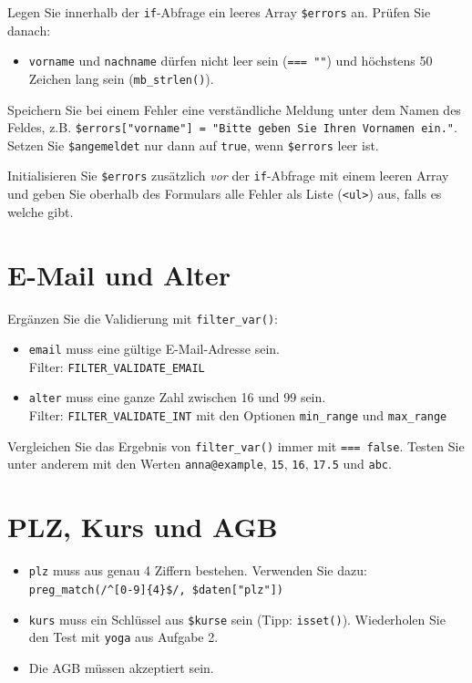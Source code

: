 \documentclass[a4paper,12pt]{article}
\begin{document}
Legen Sie innerhalb der \texttt{if}-Abfrage ein leeres Array \texttt{\$errors} an. Prüfen Sie danach:

\begin{itemize}
    \item \texttt{vorname} und \texttt{nachname} dürfen nicht leer sein (\texttt{=== "{}"{}}) und höchstens 50 Zeichen lang sein (\texttt{mb\_strlen()}).
\end{itemize}

Speichern Sie bei einem Fehler eine verständliche Meldung unter dem Namen des Feldes, z.B. \texttt{\$errors["{}vorname"{}] = "{}Bitte geben Sie Ihren Vornamen ein."{}}. Setzen Sie \texttt{\$angemeldet} nur dann auf \texttt{true}, wenn \texttt{\$errors} leer ist.

Initialisieren Sie \texttt{\$errors} zusätzlich \emph{vor} der \texttt{if}-Abfrage mit einem leeren Array und geben Sie oberhalb des Formulars alle Fehler als Liste (\texttt{<ul>}) aus, falls es welche gibt.

\section{E-Mail und Alter}

Ergänzen Sie die Validierung mit \texttt{filter\_var()}:

\begin{itemize}
    \item \texttt{email} muss eine gültige E-Mail-Adresse sein.\\
    Filter: \texttt{FILTER\_VALIDATE\_EMAIL}
    \item \texttt{alter} muss eine ganze Zahl zwischen 16 und 99 sein.\\
    Filter: \texttt{FILTER\_VALIDATE\_INT} mit den Optionen \texttt{min\_range} und \texttt{max\_range}
\end{itemize}

Vergleichen Sie das Ergebnis von \texttt{filter\_var()} immer mit \texttt{=== false}. Testen Sie unter anderem mit den Werten \texttt{anna@example}, \texttt{15}, \texttt{16}, \texttt{17.5} und \texttt{abc}.

\section{PLZ, Kurs und AGB}

\begin{itemize}
    \item \texttt{plz} muss aus genau 4 Ziffern bestehen. Verwenden Sie dazu:\\
    \texttt{preg\_match(\textquotesingle{}/\textasciicircum[0-9]\{4\}\$/\textquotesingle{}, \$daten["{}plz"{}])}
    \item \texttt{kurs} muss ein Schlüssel aus \texttt{\$kurse} sein (Tipp: \texttt{isset()}). Wiederholen Sie den Test mit \texttt{yoga} aus Aufgabe 2.
    \item Die AGB müssen akzeptiert sein.
\end{itemize}
\end{document}
